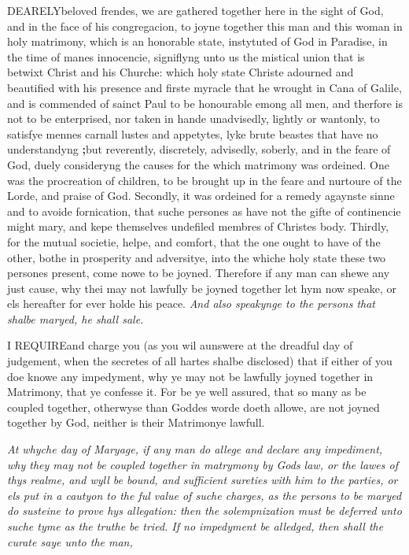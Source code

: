 DEARELY\textbf{}beloved frendes, we are gathered together here in the sight of God,
and in the face of his congregacion, to joyne together this man and this
woman in holy matrimony, which is an honorable state, instytuted of God
in Paradise, in the time of manes innocencie, signiflyng unto us the mistical
union that is betwixt Christ and his Churche: which holy state Christe
adourned and beautified with his presence and firste myracle that he wrought
in Cana of Galile, and is commended of sainct Paul to be honourable emong
all men, and therfore is not to be enterprised, nor taken in hande unadvisedly,
lightly or wantonly, to satisfye mennes carnall lustes and appetytes,
lyke brute beastes that have no understandyng \textbf{;}but reverently,
discretely, advisedly, soberly, and in the feare of God, duely consideryng
the causes for the which matrimony was ordeined. One was the procreation
of children, to be brought up in the feare and nurtoure of the Lorde,
and praise of God. Secondly, it was ordeined for a remedy agaynste sinne
and to avoide fornication, that suche persones as have not the gifte of
continencie might mary, and kepe themselves undefiled membres of Christes
body. Thirdly, for the mutual societie, helpe, and comfort, that the one
ought to have of the other, bothe in prosperity and adversitye, into the
whiche holy state these two persones present, come nowe to be joyned.
Therefore if any man can shewe any just cause, why thei may not lawfully
be joyned together let hym now speake, or els hereafter for ever holde
his peace.
\emph{And
also speakynge to the persons that shalbe maryed, he shall sale.}

I
REQUIRE\textbf{}and charge you (as you wil aunswere at the dreadful day
of judgement, when the secretes of all hartes shalbe disclosed) that if
either of you doe knowe any impedyment, why ye may not be lawfully joyned
together in Matrimony, that ye confesse it. For be ye well assured, that
so many as be coupled together, otherwyse than Goddes worde doeth allowe,
are not joyned together by God, neither is their Matrimonye lawfull.

\emph{At
whyche day of Maryage, if any man do allege and declare any impediment,
why they may not be coupled together in matrymony by Gods law, or the
lawes of thys realme, and wyll be bound, and sufficient sureties with
him to the parties, or els put in a cautyon to the ful value of suche
charges, as the persons to be maryed do susteine to prove hys allegation:
then the solempnization must be deferred unto suche tyme as the truthe
be tried. If no impedyment be alledged, then shall the curate saye unto
the man,}

